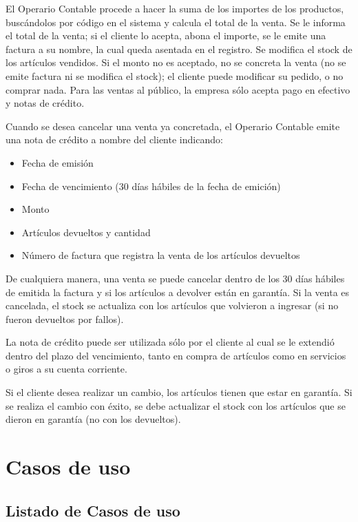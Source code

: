 \documentclass[12pt]{extarticle}
\begin{document}
\begin{spacing}{1.2}
    El Operario Contable procede a hacer la suma de los importes de los productos, buscándolos por código en el sistema y calcula el total de la venta. Se le informa el total de la venta; si el cliente lo acepta, abona el importe, se le emite una factura a su nombre, la cual queda asentada en el registro. Se modifica el stock de los artículos vendidos. 
    Si el monto no es aceptado, no se concreta la venta (no se emite factura ni se modifica el stock); el cliente puede modificar su pedido, o no comprar nada.
    Para las ventas al público, la empresa sólo acepta pago en efectivo y notas de crédito.

    Cuando se desea cancelar una venta ya concretada, el Operario Contable emite una nota de crédito a nombre del cliente indicando:
    \begin{itemize}
        \item Fecha de emisión
        \item Fecha de vencimiento (30 días hábiles de la fecha de emición)
        \item Monto
        \item Artículos devueltos y cantidad
        \item Número de factura que registra la venta de los artículos devueltos
    \end{itemize}
    De cualquiera manera, una venta se puede cancelar dentro de los 30 días hábiles de emitida la factura y si los artículos a devolver están en garantía. Si la venta es cancelada, el stock se actualiza con los artículos que volvieron a ingresar (si no fueron devueltos por fallos).

    La nota de crédito puede ser utilizada sólo por el cliente al cual se le extendió dentro del plazo del vencimiento, tanto en compra de artículos como en servicios o giros a su cuenta corriente.

    Si el cliente desea realizar un cambio, los artículos tienen que estar en garantía. Si se realiza el cambio con éxito, se debe actualizar el stock con los artículos que se dieron en garantía (no con los devueltos).

    \clearpage
    \section{Casos de uso}
    \subsection{Listado de Casos de uso}
    \begin{multicols}{2}
    \begin{enumerate}	

\end{enumerate}
\end{multicols}
\end{spacing}
\end{document}
